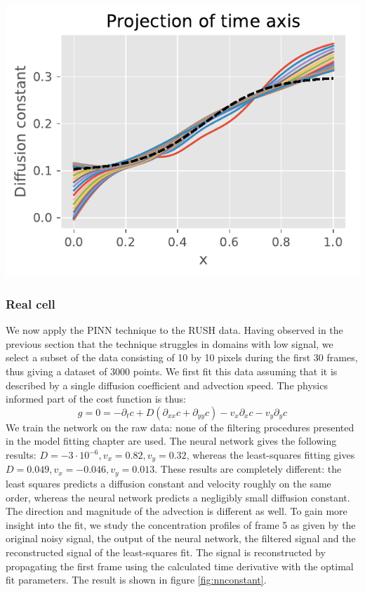 \documentclass{Dissertate}
\let\origfigure\figure
\let\endorigfigure\endfigure
\renewenvironment{figure}[1][2] {
    \expandafter\origfigure\expandafter[H]
} {
    \endorigfigure
}
\begin{document}
\begin{figure}
\hypertarget{fig:projectionD}{%
\centering
\includegraphics{source/figures/pdf/projection.pdf}
\caption{Projection of the inferred diffusion profile along the time
axis.}\label{fig:projectionD}
}
\end{figure}

\hypertarget{real-cell}{%
\subsubsection{Real cell}\label{real-cell}}

We now apply the PINN technique to the RUSH data. Having observed in the
previous section that the technique struggles in domains with low
signal, we select a subset of the data consisting of 10 by 10 pixels
during the first 30 frames, thus giving a dataset of 3000 points. We
first fit this data assuming that it is described by a single diffusion
coefficient and advection speed. The physics informed part of the cost
function is thus: \[
g=0=-\partial_tc+D(\partial_{xx}c+\partial_{yy}c)-v_x\partial_xc-v_y\partial_yc
\] We train the network on the raw data: none of the filtering
procedures presented in the model fitting chapter are used. The neural
network gives the following results:
\(D=-3\cdot10^{-6}, v_x=0.82, v_y=0.32\), whereas the least-squares
fitting gives \(D=0.049, v_x=-0.046, v_y=0.013\). These results are
completely different: the least squares predicts a diffusion constant
and velocity roughly on the same order, whereas the neural network
predicts a negligibly small diffusion constant. The direction and magnitude
of the advection is different as well. To gain more insight into the
fit, we study the concentration profiles of frame 5 as given by the
original noisy signal, the output of the neural network, the filtered
signal and the reconstructed signal of the least-squares fit. The signal is
reconstructed by propagating the first frame using the calculated time derivative with the optimal fit parameters. The result is shown in figure
\ref{fig:nnconstant}.
\end{document}
